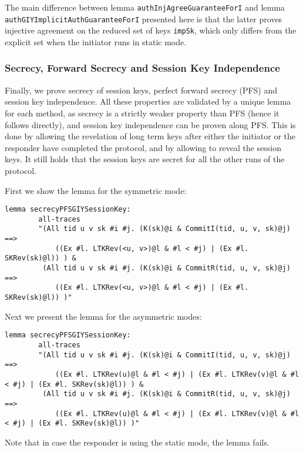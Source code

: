 The main difference between lemma
\lstinline{authInjAgreeGuaranteeForI} and lemma\\
\lstinline{authGIYImplicitAuthGuaranteeForI} presented here is that
the latter proves injective agreement on the reduced set of keys
\lstinline{impSk}, which only differs from the explicit set when the
initiator runs in static mode.

\subsubsection{Secrecy, Forward Secrecy and Session Key Independence}

Finally, we prove secrecy of session keys, perfect forward secrecy
(PFS) and session key independence. 
%
All these properties are validated by a unique lemma for each method,
as secrecy is a strictly weaker property than PFS (hence it follows
directly), and session key independence can be proven along PFS.
%
This is done by allowing the revelation of long term keys after either
the initiator or the responder have completed the protocol, and by
allowing to reveal the session keys.
%
It still holds that the session keys are secret for all the other runs
of the protocol.

First we show the lemma for the symmetric mode:
\begin{lstlisting}
lemma secrecyPFSGIYSessionKey:
        all-traces
        "(All tid u v sk #i #j. (K(sk)@i & CommitI(tid, u, v, sk)@j) ==>
            ((Ex #l. LTKRev(<u, v>)@l & #l < #j) | (Ex #l. SKRev(sk)@l)) ) &
         (All tid u v sk #i #j. (K(sk)@i & CommitR(tid, u, v, sk)@j) ==>
            ((Ex #l. LTKRev(<u, v>)@l & #l < #j) | (Ex #l. SKRev(sk)@l)) )"
\end{lstlisting}

Next we present the lemma for the asymmetric modes:
\begin{lstlisting}
lemma secrecyPFSGIYSessionKey:
        all-traces
        "(All tid u v sk #i #j. (K(sk)@i & CommitI(tid, u, v, sk)@j) ==>
            ((Ex #l. LTKRev(u)@l & #l < #j) | (Ex #l. LTKRev(v)@l & #l < #j) | (Ex #l. SKRev(sk)@l)) ) &
         (All tid u v sk #i #j. (K(sk)@i & CommitR(tid, u, v, sk)@j) ==>
            ((Ex #l. LTKRev(u)@l & #l < #j) | (Ex #l. LTKRev(v)@l & #l < #j) | (Ex #l. SKRev(sk)@l)) )"
\end{lstlisting}

Note that in case the responder is using the static mode, the lemma
fails.  

